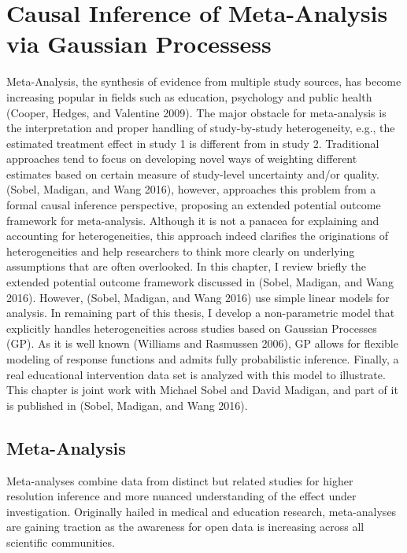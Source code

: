 \chapter{Causal Inference of Meta-Analysis via Gaussian Processess}

Meta-Analysis, the synthesis of evidence from multiple study sources,
has become increasing popular in fields such as education, psychology
and public health (Cooper, Hedges, and Valentine 2009). The major
obstacle for meta-analysis is the interpretation and proper handling of
study-by-study heterogeneity, e.g., the estimated treatment effect in
study 1 is different from in study 2. Traditional approaches tend to
focus on developing novel ways of weighting different estimates based on
certain measure of study-level uncertainty and/or quality. (Sobel,
Madigan, and Wang 2016), however, approaches this problem from a formal
causal inference perspective, proposing an extended potential outcome
framework for meta-analysis. Although it is not a panacea for explaining
and accounting for heterogeneities, this approach indeed clarifies the
originations of heterogeneities and help researchers to think more
clearly on underlying assumptions that are often overlooked. In this
chapter, I review briefly the extended potential outcome framework
discussed in (Sobel, Madigan, and Wang 2016). However, (Sobel, Madigan,
and Wang 2016) use simple linear models for analysis. In remaining part
of this thesis, I develop a non-parametric model that explicitly handles
heterogeneities across studies based on Gaussian Processes (GP). As it
is well known (Williams and Rasmussen 2006), GP allows for flexible
modeling of response functions and admits fully probabilistic inference.
Finally, a real educational intervention data set is analyzed with this
model to illustrate. This chapter is joint work with Michael Sobel and
David Madigan, and part of it is published in (Sobel, Madigan, and Wang
2016).

\section{Meta-Analysis}\label{meta-analysis}

Meta-analyses combine data from distinct but related studies for higher
resolution inference and more nuanced understanding of the effect under
investigation. Originally hailed in medical and education research,
meta-analyses are gaining traction as the awareness for open data is
increasing across all scientific communities.

